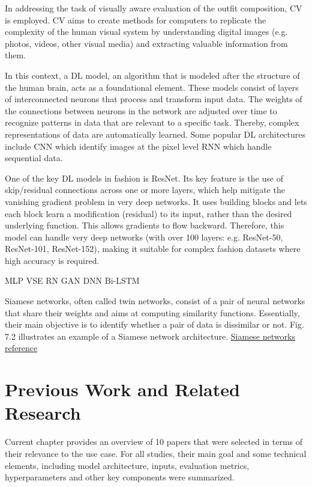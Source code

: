 In addressing the task of visually aware evaluation of the outfit composition, \acs{CV} is employed. \acs{CV} aims to create methods for computers to replicate the complexity of the human visual system by understanding digital images (e.g. photos, videos, other visual media) and extracting valuable information from them. \cite[vgl.]{brownlee_deep_2019}

In this context, a \acs{DL} model, an algorithm that is modeled after the structure of the human brain, acts as a foundational element. These models consist of layers of interconnected neurons that process and transform input data. The weights of the connections between neurons in the network are adjusted over time to recognize patterns in data that are relevant to a specific task. Thereby, complex representations of data are automatically learned. Some popular \acs{DL} architectures include \acs{CNN} which identify images at the pixel level \acs{RNN} which handle sequential data. \cite[vgl.]{muller_introduction_2017}

One of the key \acs{DL} models in fashion is \acs{ResNet}. Its key feature is the use of skip/residual connections across one or more layers, which help mitigate the vanishing gradient problem in very deep networks. It uses building blocks and lets each block learn a modification (residual) to its input, rather than the desired underlying function. This allows gradients to flow backward. Therefore, this model can handle very deep networks (with over 100 layers: e.g. ResNet-50, ResNet-101, ResNet-152), making it suitable for complex fashion datasets where high accuracy is required. \cite[vgl.]{}

MLP
VSE
RN
GAN
DNN
Bi-LSTM


Siamese networks, often called twin networks, consist of a pair of neural networks that share their weights and aims at computing similarity functions. Essentially, their main objective is to identify whether a pair of data is dissimilar or not. Fig. 7.2 illustrates an example of a Siamese network architecture.
\href{https://www.sciencedirect.com/topics/computer-science/siamese-neural-network#:~:text=A%20Siamese%20Neural%20Network%20is,%3A%20Optimum%2DPath%20Forest%2C%202022}{Siamese networks reference}

\section{Previous Work and Related Research}
Current chapter provides an overview of 10 papers that were selected in terms of their relevance to the use case. For all studies, their main goal and some technical elements, including model architecture, inputs, evaluation metrics, hyperparameters and other key components were summarized. \vspace{5mm}

